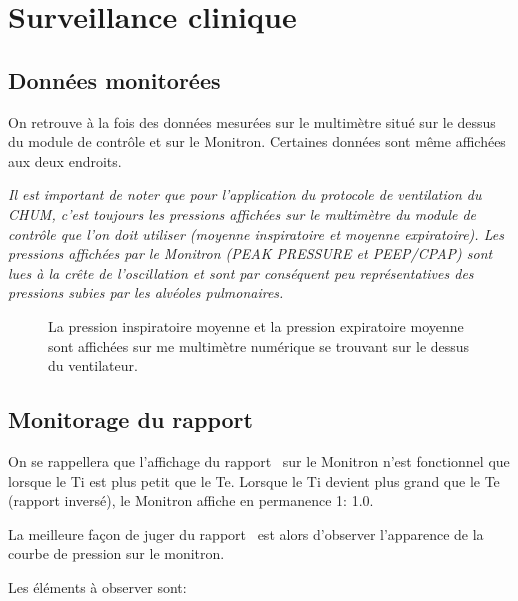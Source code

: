 \chapter{Surveillance clinique}

\section{Données monitorées}

On retrouve à la fois des données mesurées sur le multimètre situé sur
le dessus du module de contrôle et sur le Monitron. Certaines données
sont même affichées aux deux endroits.

\emph{Il est important de noter que pour l'application du protocole de
ventilation du CHUM, c'est toujours les pressions affichées sur le
multimètre du module de contrôle que l'on doit utiliser (moyenne
inspiratoire et moyenne expiratoire).  Les pressions affichées par le Monitron (PEAK PRESSURE et PEEP/CPAP)
sont lues à la crête de l'oscillation et sont par conséquent peu
représentatives des pressions subies par les alvéoles pulmonaires.
}


\begin{figure}
	
	\caption{La pression inspiratoire moyenne et la pression expiratoire moyenne sont affichées sur me multimètre numérique se trouvant sur le dessus du ventilateur.}
\end{figure}

\section{Monitorage du rapport \ie}

On se rappellera que l'affichage du rapport \ie\ sur le Monitron n'est
fonctionnel que lorsque le Ti est plus petit que le Te. Lorsque le Ti
devient plus grand que le Te (rapport inversé), le Monitron affiche en
permanence 1\string: 1.0.

La meilleure façon de juger du rapport \ie\ est alors d'observer
l'apparence de la courbe de pression sur le monitron.

Les éléments à observer sont:

